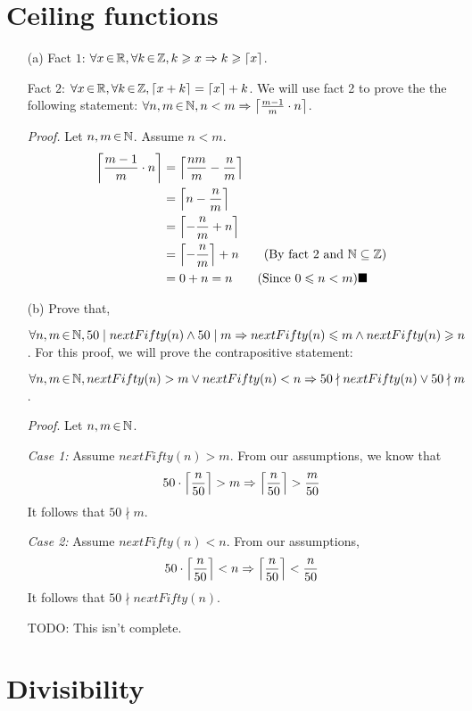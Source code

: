 \documentclass[12pt]{article}
\begin{document}
\section{Ceiling functions}
\begin{enumerate}
\item[(a)] Fact $1$: $\forall x \,{\in}\, \mathbb R, \forall k \,{\in}\, \mathbb Z, k \geqslant x \Rightarrow k \geqslant \left \lceil x \right \rceil$.

Fact $2$: $\forall x \,{\in}\, \mathbb R, \forall k \,{\in}\, \mathbb Z, \left \lceil x + k \right \rceil = \left \lceil x \right \rceil + k$. We will use fact 2 to prove the the following statement: $\forall n, m \,{\in}\, \mathbb N, n < m \Rightarrow \left \lceil \frac{m - 1}{m} \cdot n \right \rceil$.

\emph{Proof.} Let $n, m \,{\in}\, \mathbb N$. Assume $n < m$.
\begin{align*}
  \ceil{\frac{m - 1}{m} \cdot n} &= \ceil{\frac{nm}{m} - \frac{n}{m}} \\
  &= \ceil{n - \frac{n}{m}} \\
  &= \ceil{-\frac{n}{m} + n} \\
  &= \ceil{-\frac{n}{m}} + n \tag{By fact 2 and $\N \subseteq \Z$} \\
  &= 0 + n = n \tag{Since $0 \leqslant n < m$}
  \blacksquare %
\end{align*}

\item[(b)] Prove that,

$\forall n, m \,{\in}\, \mathbb N, 50 \mid nextFifty(n) \wedge 50 \mid m \Rightarrow nextFifty(n) \leqslant m \wedge nextFifty(n) \geqslant n$. For this proof, we will prove the contrapositive statement:

$\forall n, m \,{\in}\, \mathbb N, nextFifty(n) > m \vee nextFifty(n) < n \Rightarrow 50 \nmid nextFifty(n) \vee 50 \nmid m$.

\emph{Proof}.
Let $n, m \,{\in}\, \mathbb N$.

\emph{Case 1:} Assume $nextFifty(n) > m$. From our assumptions, we know that
\[
50 \cdot \left \lceil \frac{n}{50} \right \rceil > m \Rightarrow \left \lceil \frac{n}{50} \right \rceil > \frac{m}{50}
\]
It follows that $50 \nmid m$.

\emph{Case 2:} Assume $nextFifty(n) < n$. From our assumptions,
\[
50 \cdot \left \lceil \frac{n}{50} \right \rceil < n \Rightarrow \left \lceil \frac{n}{50} \right \rceil < \frac{n}{50}
\]
It follows that $50 \nmid nextFifty(n)$.

TODO: This isn't complete.


\end{enumerate}

\newpage

\section{Divisibility}
\end{document}
